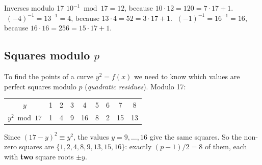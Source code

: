 \begin{framedex}{Inverses modulo 17}
  $10^{-1} \bmod 17 = 12$, because $10 \cdot 12 = 120 = 7 \cdot 17 + 1$.
  $\;(-4)^{-1} = 13^{-1} = 4$, because $13 \cdot 4 = 52 = 3 \cdot 17 + 1$.
  $\;(-1)^{-1} = 16^{-1} = 16$, because $16 \cdot 16 = 256 = 15 \cdot 17 + 1$.
\end{framedex}


\subsection{Squares modulo $p$}

To find the points of a curve $y^2 = f(x)$ we need to know which values are perfect squares modulo $p$ (\textit{quadratic residues}). Modulo 17:
\begin{center}
  \begin{tabular}{c|cccccccc}
    \toprule
    $y$ & 1 & 2 & 3 & 4 & 5 & 6 & 7 & 8 \\
    $y^2 \bmod 17$ & 1 & 4 & 9 & 16 & 8 & 2 & 15 & 13 \\
    \bottomrule
  \end{tabular}
\end{center}
Since $(17 - y)^2 \equiv y^2$, the values $y = 9, \ldots, 16$ give the same squares. So the non-zero squares are $\{1, 2, 4, 8, 9, 13, 15, 16\}$: exactly $(p-1)/2 = 8$ of them, each with \textbf{two} square roots $\pm y$.

